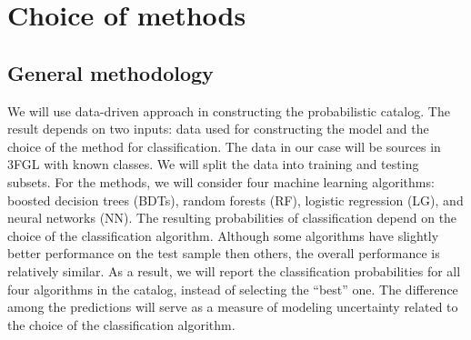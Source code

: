 \section{Choice of methods}

\subsection{General methodology}
We will use data-driven approach in constructing the probabilistic catalog.
The result depends on two inputs: data used for constructing the model and the choice of the method for classification.
The data in our case will be sources in 3FGL with known classes. 
We will split the data into training and testing subsets.
For the methods, we will consider four machine learning algorithms: boosted decision trees (BDTs),  random forests (RF),
logistic regression (LG), and neural networks (NN).
The resulting probabilities of classification depend on the choice of the classification algorithm.
Although some algorithms have slightly better performance on the test sample then others,
the overall performance is relatively similar.
As a result, we will report the classification probabilities for all four algorithms in the catalog, instead of selecting the 
``best'' one.
The difference among the predictions will serve as a measure of modeling uncertainty related to the choice of the classification algorithm.

